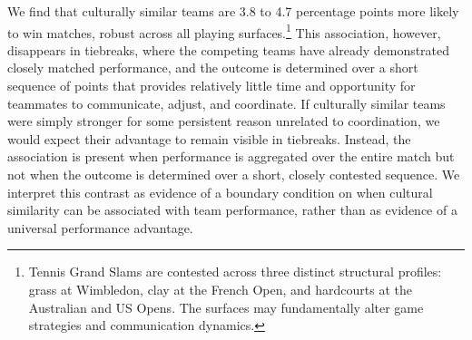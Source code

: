 \documentclass[10pt]{article}
\begin{document}
We find that culturally similar teams are 3.8 to 4.7 percentage points more likely to win  matches, robust across all playing surfaces.\footnote{Tennis Grand Slams are contested across three distinct structural profiles: grass at Wimbledon, clay at the French Open, and hardcourts at the Australian and US Opens. The surfaces may fundamentally alter game strategies and communication dynamics.} This association, however, disappears in tiebreaks, where the competing teams have already demonstrated closely matched performance, and the outcome is determined over a short sequence of points that provides relatively little time and opportunity for teammates to communicate, adjust, and coordinate. %
If culturally similar teams were simply stronger for some persistent reason unrelated to coordination, we would expect their advantage to remain visible in tiebreaks. Instead, the association is present when performance is aggregated over the entire match but not when the outcome is determined over a short, closely contested sequence. We interpret this contrast as evidence of a boundary condition on when cultural similarity can be associated with team performance, rather than as evidence of a universal performance advantage.



\end{document}

